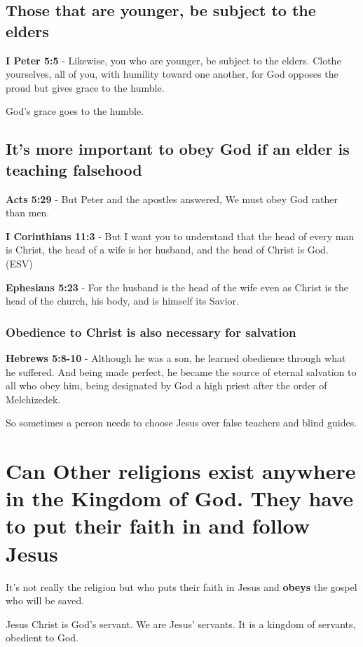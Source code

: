 \documentclass[11pt]{article}
\begin{document}
\subsection{Those that are younger, be subject to the elders}
\label{sec:org33955a8}
\textbf{I Peter 5:5} - Likewise, you who are younger, be subject to the elders. Clothe yourselves, all of you, with humility toward one another, for God opposes the proud but gives grace to the humble.

God's grace goes to the humble.

\subsection{It's more important to obey God if an elder is teaching falsehood}
\label{sec:org7b860c8}
\textbf{Acts 5:29} - But Peter and the apostles answered, We must obey God rather than men.

\textbf{I Corinthians 11:3} - But I want you to understand that the head of every man is Christ, the head of a wife is her husband, and the head of Christ is God. (ESV)

\textbf{Ephesians 5:23} - For the husband is the head of the wife even as Christ is the head of the church, his body, and is himself its Savior.

\subsubsection{Obedience to Christ is also necessary for salvation}
\label{sec:org5015198}
\textbf{Hebrews 5:8-10} - Although he was a son, he learned obedience through what he suffered. And being made perfect, he became the source of eternal salvation to all who obey him, being designated by God a high priest after the order of Melchizedek.

So sometimes a person needs to choose Jesus over false teachers and blind guides.

\section{Can Other religions exist anywhere in the Kingdom of God. They have to put their faith in and follow Jesus}
\label{sec:org38784e8}
It's not really the religion but who puts their faith in Jesus and \textbf{obeys} the gospel who will be saved.

Jesus Christ is God's servant. We are Jesus' servants. It is a kingdom of servants, obedient to God.
\end{document}
